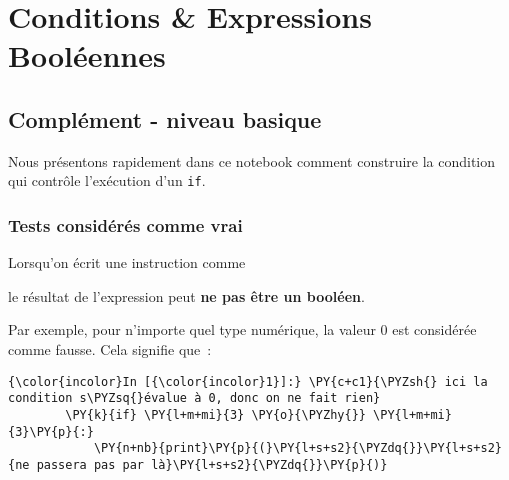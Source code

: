     
    
    
    

    

    \hypertarget{conditions-expressions-booluxe9ennes}{%
\section{Conditions \& Expressions
Booléennes}\label{conditions-expressions-booluxe9ennes}}

    \hypertarget{compluxe9ment---niveau-basique}{%
\subsection{Complément - niveau
basique}\label{compluxe9ment---niveau-basique}}

    Nous présentons rapidement dans ce notebook comment construire la
condition qui contrôle l'exécution d'un \texttt{if}.

    \hypertarget{tests-considuxe9ruxe9s-comme-vrai}{%
\subsubsection{Tests considérés comme
vrai}\label{tests-considuxe9ruxe9s-comme-vrai}}

    Lorsqu'on écrit une instruction comme

\begin{Shaded}
\begin{Highlighting}[frame=lines,framerule=0.6mm,rulecolor=\color{asisframecolor}]
 \OperatorTok{<}\OperatorTok{>}\NormalTok{:}
   \OperatorTok{<}\OperatorTok{>}
\end{Highlighting}
\end{Shaded}

le résultat de l'expression peut \textbf{ne pas être un booléen}.

Par exemple, pour n'importe quel type numérique, la valeur 0 est
considérée comme fausse. Cela signifie que~:

    \begin{Verbatim}[commandchars=\\\{\},frame=single,framerule=0.3mm,rulecolor=\color{cellframecolor}]
{\color{incolor}In [{\color{incolor}1}]:} \PY{c+c1}{\PYZsh{} ici la condition s\PYZsq{}évalue à 0, donc on ne fait rien}
        \PY{k}{if} \PY{l+m+mi}{3} \PY{o}{\PYZhy{}} \PY{l+m+mi}{3}\PY{p}{:}
            \PY{n+nb}{print}\PY{p}{(}\PY{l+s+s2}{\PYZdq{}}\PY{l+s+s2}{ne passera pas par là}\PY{l+s+s2}{\PYZdq{}}\PY{p}{)}
\end{Verbatim}


